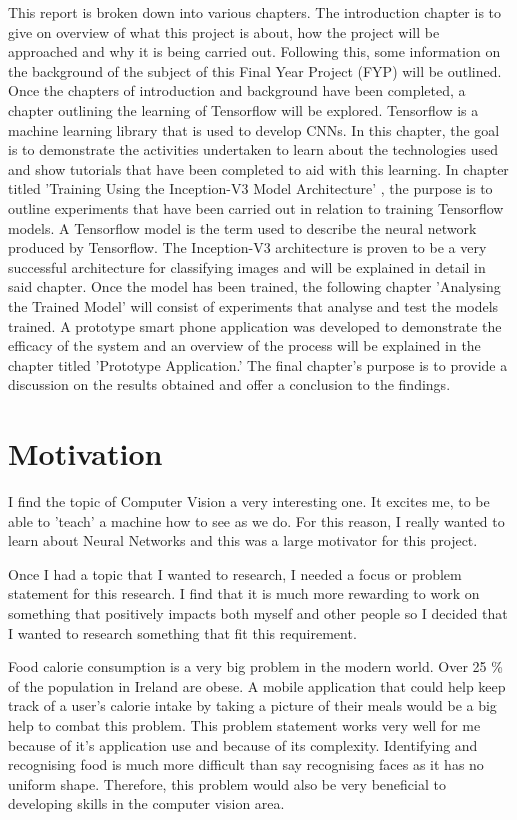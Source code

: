 This report is broken down into various chapters.
The introduction chapter is to give on overview of what this project is about, how the project will be approached and why it is being carried out.
Following this, some information on the background of the subject of this Final Year Project (FYP) will be outlined. Once the chapters of introduction and background have been completed, a chapter outlining the learning of Tensorflow will be explored. Tensorflow is a machine learning library that is used to develop CNNs. In this chapter, the goal is to demonstrate the activities undertaken to learn about the technologies used and show tutorials that have been completed to aid with this learning.
In chapter titled 'Training Using the Inception-V3 Model Architecture' , the purpose is to outline experiments that have been carried out in relation to training Tensorflow models.
A Tensorflow model is the term used to describe the neural network produced by Tensorflow. 
The Inception-V3 architecture is proven to be a very successful architecture for classifying images and will be explained in detail in said chapter.
Once the model has been trained, the following chapter 'Analysing the Trained Model' will consist of experiments that analyse and test the models trained.
A prototype smart phone application was developed to demonstrate the efficacy of the system and an overview of the process will be explained in the chapter titled 'Prototype Application.'
The final chapter's purpose is to provide a discussion on the results obtained and offer a conclusion to the findings.

\section{Motivation}
I find the topic of Computer Vision a very interesting one.
It excites me, to be able to 'teach' a machine how to see as we do.
For this reason, I really wanted to learn about Neural Networks
and this was a large motivator for this project.

Once I had a topic that I wanted to research, I needed a focus or problem statement for this research.
I find that it is much more rewarding to work on something that positively
impacts both myself and other people so I decided that I wanted to research
something that fit this requirement.

Food calorie consumption is a very big problem in the modern world.
Over 25 \% of the population in Ireland are obese.
A mobile application that could help keep track of a user's calorie intake by taking a picture of their meals would be a big help to combat this problem.
This problem statement works very well for me because of it's application use and because of its complexity.
Identifying and recognising food is much more difficult than say recognising faces as it has no uniform shape.
Therefore, this problem would also be very beneficial to developing skills in the computer vision area.

